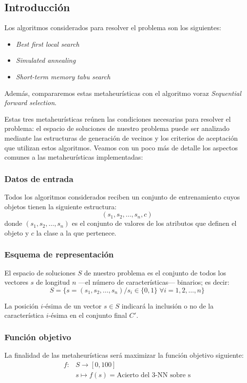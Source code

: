 \documentclass[a4paper, 11pt, titlepage]{article}
\begin{document}
    \subsection{Introducción}

    Los algoritmos considerados para resolver el problema son los siguientes:
    \begin{itemize}
        \item \emph{Best first local search}
        \item \emph{Simulated annealing}
        \item \emph{Short-term memory tabu search}
    \end{itemize}

    Además, compararemos estas metaheurísticas con el algoritmo voraz \emph{Sequential forward selection}.

    Estas tres metaheurísticas reúnen las condiciones necesarias para resolver el problema: el espacio de soluciones de nuestro problema puede ser analizado mediante las estructuras de generación de vecinos y los criterios de aceptación que utilizan estos algoritmos. Veamos con un poco más de detalle los aspectos comunes a las metaheurísticas implementadas:

    \subsubsection*{Datos de entrada}
    Todos los algoritmos considerados reciben un conjunto de entrenamiento cuyos objetos tienen la siguiente estructura:
    \[
    (s_1, s_2, \dots, s_n, c)
    \]
    donde $(s_1, s_2, \dots, s_n)$ es el conjunto de valores de los atributos que definen el objeto y $c$ la clase a la que pertenece.

    \subsubsection*{Esquema de representación}
    El espacio de soluciones $S$ de nuestro problema es el conjunto de todos los vectores $s$ de longitud $n$ ---el número de características--- binarios; es decir:
    \[
    S = \{s = (s_1, s_2, \dots, s_n) / s_i \in \{0,1\} \;\forall i = 1, 2, \dots, n\}
    \]

    La posición $i$-ésima de un vector $s \in S$ indicará la inclusión o no de la característica $i$-ésima en el conjunto final $C'$.

    \subsubsection*{Función objetivo}
    La finalidad de las metaheurísticas será maximizar la función objetivo siguiente:
    \begin{align*}
        f \colon &S \to [0,100] \\
        &s \mapsto f(s) = \textrm{Acierto del 3-NN sobre s}
    \end{align*}
\end{document}
